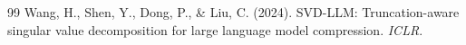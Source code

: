\documentclass[12pt,a4paper]{report}
\theoremstyle{definition}
\begin{document}
\begin{latin}
\begin{thebibliography}{99}
Wang, H., Shen, Y., Dong, P., \& Liu, C. (2024).
SVD-LLM: Truncation-aware singular value decomposition for large language model compression.
\textit{ICLR}.



















































































































\end{thebibliography}
\end{latin}
\end{document}
